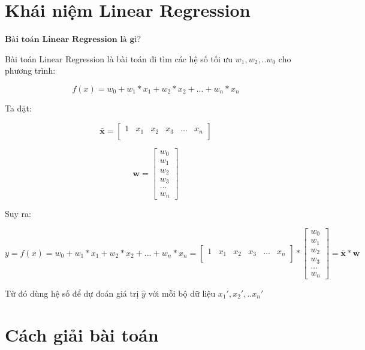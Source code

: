 \documentclass[12pt,letterpaper]{article}
\begin{document}
\section*{Khái niệm Linear Regression}

    $\textbf{Bài toán Linear Regression là gì?}$
    
    Bài toán Linear Regression là bài toán đi tìm các hệ số tối ưu $w_1, w_2,.. w_0$ cho phương trình:
    
    $$ f(x) = w_0 + w_1*x_1 + w_2*x_2 + ... + w_n*x_n $$
    
    Ta đặt:
    
        $$
        \bar{\textbf{x}} 
        = 
        \begin{bmatrix}
        1 & x_1 & x_2 & x_3 & \dots  & x_n \\
        \end{bmatrix}
        $$
    
        $$
        \textbf{w} 
        = 
        \begin{bmatrix}
        w_0 \\ w_1 \\ w_2 \\ w_3 \\ \dots  \\ w_n 
        \end{bmatrix}
        $$
    
    Suy ra:
    
        $$
        y = f(x) 
        = 
        w_0 + w_1*x_1 + w_2*x_2 + ... + w_n*x_n 
        =
        \begin{bmatrix}
        1 & x_1 & x_2 & x_3 & \dots  & x_n \\
        \end{bmatrix}
        *
        \begin{bmatrix}
        w_0 \\ w_1 \\ w_2 \\ w_3 \\ \dots  \\ w_n 
        \end{bmatrix}
        = 
        \bar{\textbf{x}}*\textbf{w} 
        $$
    
    Từ đó dùng hệ số để dự đoán giá trị $\hat{y}$ với mỗi bộ dữ liệu $x_1', x_2',.. x_n'$
    
    

\section*{Cách giải bài toán}   
\end{document}
